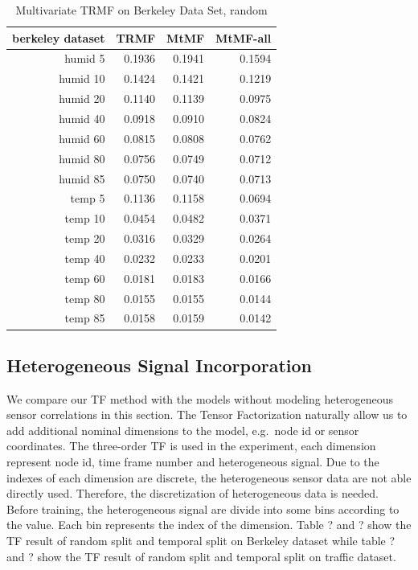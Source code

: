 \begin{table}[htbp]
\caption{Multivariate TRMF on Berkeley Data Set, random}
\label{traffic}
\begin{tabular}{r | r r r}
berkeley dataset	&TRMF	&MtMF	&MtMF-all \\ \hline
humid  5 &0.1936	&0.1941	&0.1594\\
humid 10 &0.1424	&0.1421	&0.1219\\
humid 20 &0.1140	&0.1139	&0.0975\\
humid 40 &0.0918	&0.0910	&0.0824\\
humid 60 &0.0815	&0.0808	&0.0762\\
humid 80 &0.0756	&0.0749	&0.0712\\
humid 85 &0.0750	&0.0740	&0.0713\\
 temp  5 &0.1136	&0.1158	&0.0694\\
 temp 10 &0.0454	&0.0482	&0.0371\\
 temp 20 &0.0316	&0.0329	&0.0264\\
 temp 40 &0.0232	&0.0233	&0.0201\\
 temp 60 &0.0181	&0.0183	&0.0166\\
 temp 80 &0.0155	&0.0155	&0.0144\\
 temp 85 &0.0158	&0.0159	&0.0142
\end{tabular}
\end{table}
\subsection{Heterogeneous Signal Incorporation}

We compare our TF method with the models without modeling heterogeneous sensor correlations in this section.
The Tensor Factorization naturally allow us to add additional nominal dimensions to the model, e.g.\ node id or sensor coordinates.
The three-order TF is used in the experiment, each dimension represent node id, time frame number and heterogeneous signal.  
Due to the indexes of each dimension are discrete, the heterogeneous sensor data are not able directly used.
Therefore, the discretization of heterogeneous data is needed.
Before training, the heterogeneous signal are divide into some bins according to the value.
Each bin represents the index of the dimension.
Table ? and ? show the TF result of random split and temporal split on Berkeley dataset while table ? and ? show the TF result of random split and temporal split on traffic dataset.

